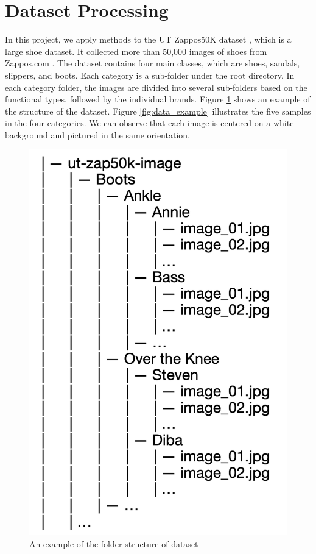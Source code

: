 \section{Dataset Processing}

In this project, we apply methods to the UT Zappos50K dataset \cite{yu2014fine}, which is a large shoe dataset. It collected more than 50,000 images of shoes from Zappos.com \cite{}. The dataset contains four main classes, which are shoes, sandals, slippers, and boots. Each category is a sub-folder under the root directory. In each category folder, the images are divided into several sub-folders based on the functional types, followed by the individual brands. Figure \ref{fig:data_folder} shows an example of the structure of the dataset. Figure \ref{fig:data_example} illustrates the five samples in the four categories. We can observe that each image is centered on a white background and pictured in the same orientation. 

\begin{figure}[h]
	\includegraphics[width=0.5\linewidth]{figs/data_folder.png}
	\caption{An example of the folder structure of dataset }
	\label{fig:data_folder}
\end{figure}


